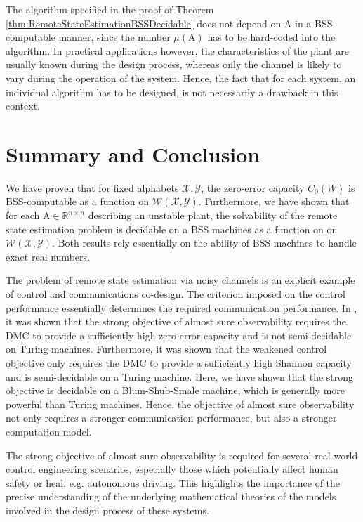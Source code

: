 \documentclass[conference]{IEEEtran}
\def\X{{\mathcal X}}
\def\Y{{\mathcal Y}}
\def\W{{\mathcal W}}
\def\RR{{\mathbb R}}
\def\mA{\bm{\mathrm{A}}}
\newcommand{\tbr}[1]{}
\begin{document}
	The algorithm specified in the proof of Theorem \ref{thm:RemoteStateEstimationBSSDecidable} does not depend on \(\mA\) in a BSS-computable manner,
	since the number \(\mu(\mA)\) has to be hard-coded into the algorithm. In practical applications however, the characteristics of the plant
	are usually known during the design process, whereas only the channel is likely to vary during the operation
	of the system. Hence, the fact that for each system, an individual algorithm has to be designed, is not necessarily a drawback in this context.
	
\section{Summary and Conclusion}	\label{sec:Conclusion}
	We have proven that for fixed alphabets \(\X,\Y\), the zero-error capacity \(C_0(W)\) is BSS-computable as a function on \(\W(\X,\Y)\).
	Furthermore, we have shown that for each \(\mA\in \RR^{n\times n}\) describing an unstable plant, the solvability of the remote state estimation
	problem is decidable on a BSS machines as a function on on \(\W(\X,\Y)\). Both results rely essentially on the ability of BSS machines to handle exact real numbers.
	
	The problem of remote state estimation via noisy channels is an explicit example of control and communications co-design. The criterion imposed on the control performance
	essentially determines the required communication performance. In \cite{MS07,BoBoDe21TAC}\tbr{{\color{red}\(\leftarrow\) Change to TAC!~}}, it was shown that the strong objective of almost sure observability requires the DMC to provide a sufficiently high
	zero-error capacity and is not semi-decidable on Turing machines. Furthermore, it was shown that the weakened control objective only requires the DMC to provide a sufficiently high
	Shannon capacity and is semi-decidable on a Turing machine. Here, we have shown that the strong objective is decidable on a Blum-Shub-Smale machine, which is generally more powerful than
	Turing machines. Hence, the objective of almost sure observability not only requires a stronger communication performance, but also a stronger computation model.
	
	The strong objective of almost sure observability is required for several real-world control engineering scenarios, especially those which potentially affect human safety or heal, e.g.
	autonomous driving. This highlights the importance of the precise understanding of the underlying mathematical theories of the models involved in the design process of these systems.

		



\end{document}
